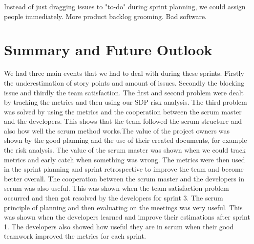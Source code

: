 \documentclass{article}
\begin{document}
Instead of just dragging issues to "to-do" during sprint planning, we could assign people immediately. More product backlog grooming. Bad software.

\section{Summary and Future Outlook}

We had three main events that we had to deal with during these sprints. Firstly the underestimation of story points and amount of issues. Secondly the blocking issue and thirdly the team satisfaction. The first and second problem were dealt by tracking the metrics and then using our SDP risk analysis. The third problem was solved by using the metrics and the cooperation between the scrum master and the developers. This shows that the team followed the scrum structure and also how well the scrum method works.\newline \newline The value of the project owners was shown by the good planning and the use of their created documents, for example the risk analysis. The value of the scrum master was shown when we could track metrics and early catch when something was wrong. The metrics were then used in the sprint planning and sprint retrospective to improve the team and become better overall. The cooperation between the scrum master and the developers in scrum was also useful. This was shown when the team satisfaction problem occurred and then got resolved by the developers for sprint 3. The scrum principle of planning and then evaluating on the meetings was very useful. This was shown when the developers learned and improve their estimations after sprint 1. The developers also showed how useful they are in scrum when their good teamwork improved the metrics for each sprint.
\end{document}
